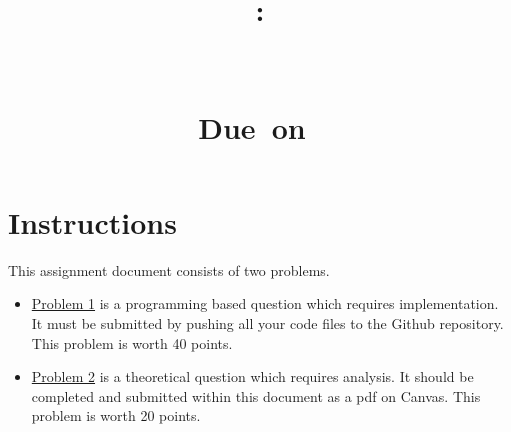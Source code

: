 \documentclass{article}
\title{
	\vspace{2in}
	\textmd{\textbf{\hmwkClass:\\ \hmwkTitle}}\\
	\normalsize\vspace{0.1in}\small{\hmwkClassInstructor}\\
	\normalsize\vspace{0.1in}\small{Due\ on\ \hmwkDueDate}\\
	\vspace{3in}
}
\author{\hmwkAuthorName}
\date{}
\begin{document}
	
\maketitle
	
\pagebreak
\section{Instructions}
This assignment document consists of two problems.

\begin{itemize} 
	\item \underline{Problem 1} is a programming based question which requires implementation. It must be submitted by pushing all your code files to the Github repository. This problem is worth 40 points.
	\item \underline{Problem 2} is a theoretical question which requires analysis. It should be completed and submitted within this document as a pdf on Canvas. This problem is worth 20 points.
	

\end{itemize}
\end{document}
